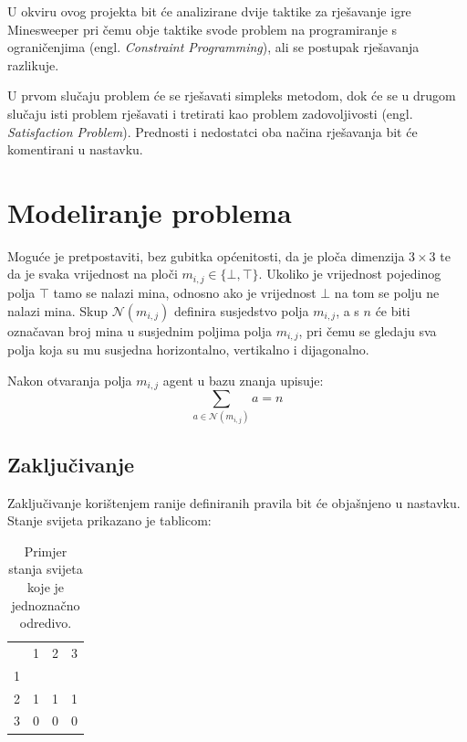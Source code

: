 \documentclass{article}
\numberwithin{figure}{section}
\numberwithin{table}{section}
\begin{document}
U okviru ovog projekta bit će analizirane dvije taktike za rješavanje igre Minesweeper pri čemu obje
taktike svode problem na programiranje s ograničenjima (engl. \textit{Constraint Programming}),
ali se postupak rješavanja razlikuje.

U prvom slučaju problem će se rješavati simpleks metodom, dok će se u drugom slučaju isti
problem rješavati i tretirati kao problem zadovoljivosti (engl. \textit{Satisfaction Problem}).
Prednosti i nedostatci oba načina rješavanja bit će komentirani u nastavku.

\section{Modeliranje problema}

Moguće je pretpostaviti, bez gubitka općenitosti, da je ploča dimenzija $3 \times 3$ te da je
svaka vrijednost na ploči $m_{i, j} \in \{\bot, \top\}$. Ukoliko je vrijednost pojedinog polja
$\top$ tamo se nalazi mina, odnosno ako je vrijednost $\bot$ na tom se polju ne nalazi mina.
Skup $\mathcal{N}(m_{i, j})$ definira susjedstvo polja $m_{i, j}$, a s $n$ će biti označavan broj mina
u susjednim poljima polja $m_{i, j}$, pri čemu se gledaju sva polja koja su mu susjedna horizontalno, vertikalno i dijagonalno.

Nakon otvaranja polja $m_{i, j}$ agent u bazu znanja upisuje:
\begin{equation}
    \sum_{a \in \mathcal{N}(m_{i, j})} a = n
    \label{eq:1}
\end{equation}

\subsection{Zaključivanje}
Zaključivanje korištenjem ranije definiranih pravila bit će objašnjeno u nastavku. Stanje
svijeta prikazano je tablicom:

\begin{table}[ht]
    \centering
    \begin{tabular}{llll}
                           & 1                      & 2                      & 3                      \\ \cline{2-4}
    \multicolumn{1}{l|}{1} & \multicolumn{1}{l|}{}  & \multicolumn{1}{l|}{}  & \multicolumn{1}{l|}{}  \\ \cline{2-4}
    \multicolumn{1}{l|}{2} & \multicolumn{1}{l|}{1} & \multicolumn{1}{l|}{1} & \multicolumn{1}{l|}{1} \\ \cline{2-4}
    \multicolumn{1}{l|}{3} & \multicolumn{1}{l|}{0} & \multicolumn{1}{l|}{0} & \multicolumn{1}{l|}{0}  \\ \cline{2-4}
    \end{tabular}
    \label{table:state1}
    \caption{Primjer stanja svijeta koje je jednoznačno odredivo.}
\end{table}
\end{document}

